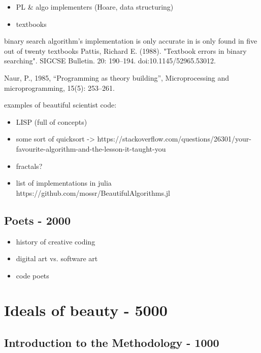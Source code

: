 {%



\begin{itemize}
    \item PL \& algo implementers (Hoare, data structuring)
    \item textbooks
\end{itemize}

binary search algorithm's implementation is only accurate in  is only found in five out of twenty textbooks Pattis, Richard E. (1988). "Textbook errors in binary searching". SIGCSE Bulletin. 20: 190–194. doi:10.1145/52965.53012.

Naur, P., 1985, “Programming as theory building”, Microprocessing and microprogramming, 15(5): 253–261.

examples of beautiful scientist code:

\begin{itemize}
    \item LISP (full of concepts)
    \item some sort of quicksort -> https://stackoverflow.com/questions/26301/your-favourite-algorithm-and-the-lesson-it-taught-you
    \item fractals?
    \item list of implementations in julia https://github.com/mossr/BeautifulAlgorithms.jl
\end{itemize}

\subsection{Poets - 2000}

\begin{itemize}
    \item history of creative coding
    \item digital art vs. software art
    \item code poets
\end{itemize}


\section{Ideals of beauty - 5000}

\subsection{Introduction to the Methodology - 1000}

}
